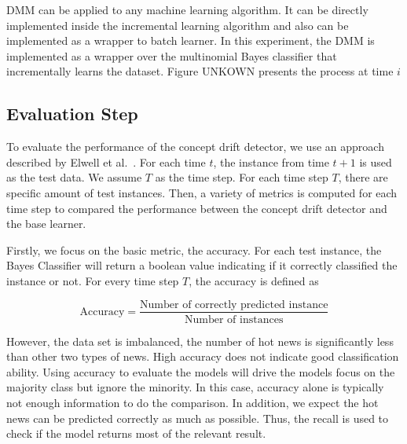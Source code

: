 DMM can be applied to any machine learning algorithm. It can be directly implemented inside the incremental learning algorithm and also can be implemented as a wrapper to batch learner. In this experiment, the DMM is implemented as a wrapper over the multinomial Bayes classifier that incrementally learns the dataset. Figure UNKOWN presents the process at time $i$



\subsection{Evaluation Step}
To evaluate the performance of the concept drift detector, we use an approach described by Elwell et al.~\cite{Elwell2011}. For each time $t$, the instance from time $t+1$ is used as the test data. We assume $T$ as the time step. For each time step $T$, there are specific amount of test instances. Then, a variety of metrics is computed for each time step to compared the performance between the concept drift detector and the base learner. 

Firstly, we focus on the basic metric, the accuracy. For each test instance, the Bayes Classifier will return a boolean value indicating if it correctly classified the instance or not. For every time step $T$, the accuracy is defined as

\begin{equation}
\mbox{Accuracy} = \frac{\mbox{Number of correctly predicted instance} }{\mbox{Number of instances}}
\end{equation}

However, the data set is imbalanced, the number of hot news is significantly less than other two types of news. High accuracy does not indicate good classification ability. Using accuracy to evaluate the models will drive the models focus on the majority class but ignore the minority. In this case, accuracy alone is typically not enough information to do the comparison. In addition, we expect the hot news can be predicted correctly as much as possible. Thus, the recall is used to check if the model returns most of the relevant result.


